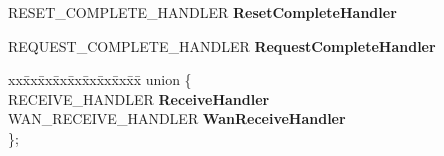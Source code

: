 \begin{DoxyCompactItemize}
\begin{tabbing}
\end{tabbing}\item 
\mbox{\label{struct___n_d_i_s40___p_r_o_t_o_c_o_l___c_h_a_r_a_c_t_e_r_i_s_t_i_c_s_a9b56bb6f0c7d038b589e76400d6fa4da}} 
R\+E\+S\+E\+T\+\_\+\+C\+O\+M\+P\+L\+E\+T\+E\+\_\+\+H\+A\+N\+D\+L\+ER {\bfseries Reset\+Complete\+Handler}
\item 
\mbox{\label{struct___n_d_i_s40___p_r_o_t_o_c_o_l___c_h_a_r_a_c_t_e_r_i_s_t_i_c_s_a33fd28816a3fb64ef6bebb12dfe5079d}} 
R\+E\+Q\+U\+E\+S\+T\+\_\+\+C\+O\+M\+P\+L\+E\+T\+E\+\_\+\+H\+A\+N\+D\+L\+ER {\bfseries Request\+Complete\+Handler}
\item 
\mbox{\label{struct___n_d_i_s40___p_r_o_t_o_c_o_l___c_h_a_r_a_c_t_e_r_i_s_t_i_c_s_ad39cb0b9355313bc3d79046f818d23e2}} 
\begin{tabbing}
xx\=xx\=xx\=xx\=xx\=xx\=xx\=xx\=xx\=\kill
union \{\\
\>RECEIVE\_HANDLER {\bfseries ReceiveHandler}\\
\>WAN\_RECEIVE\_HANDLER {\bfseries WanReceiveHandler}\\
\}; \\


\end{tabbing}
\end{DoxyCompactItemize}
